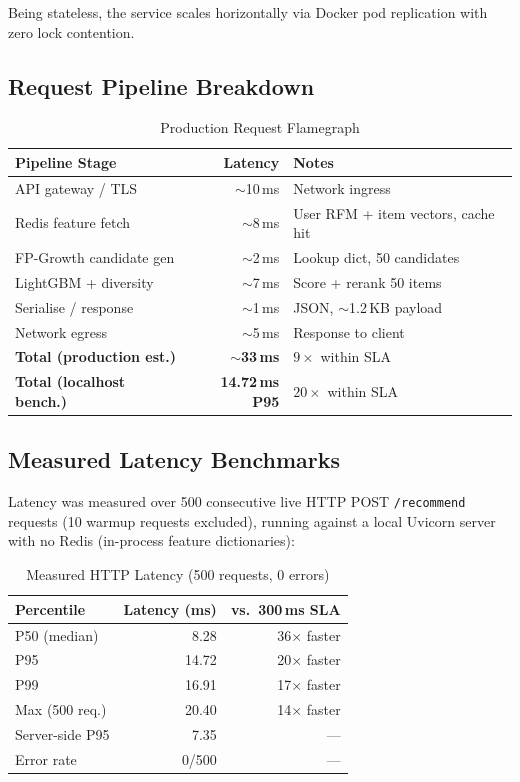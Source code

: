\documentclass[conference]{IEEEtran}
\begin{document}
Being stateless, the service scales horizontally via Docker pod replication
with zero lock contention.

\subsection{Request Pipeline Breakdown}

\begin{table}[h]
\caption{Production Request Flamegraph}
\centering
\begin{tabular}{lrl}
\toprule
Pipeline Stage & Latency & Notes \\
\midrule
API gateway / TLS     & $\sim$10\,ms & Network ingress \\
Redis feature fetch   & $\sim$8\,ms  & User RFM + item vectors, cache hit \\
FP-Growth candidate gen & $\sim$2\,ms & Lookup dict, 50 candidates \\
LightGBM + diversity  & $\sim$7\,ms  & Score + rerank 50 items \\
Serialise / response  & $\sim$1\,ms  & JSON, $\sim$1.2\,KB payload \\
Network egress        & $\sim$5\,ms  & Response to client \\
\midrule
\textbf{Total (production est.)} & $\sim$\textbf{33\,ms} & $9\times$ within SLA \\
\textbf{Total (localhost bench.)} & \textbf{14.72\,ms P95} & $20\times$ within SLA \\
\bottomrule
\end{tabular}
\end{table}

\subsection{Measured Latency Benchmarks}

Latency was measured over 500 consecutive live HTTP POST \texttt{/recommend}
requests (10 warmup requests excluded), running against a local Uvicorn server
with no Redis (in-process feature dictionaries):

\begin{table}[h]
\caption{Measured HTTP Latency (500 requests, 0 errors)}
\centering
\begin{tabular}{lrr}
\toprule
Percentile & Latency (ms) & vs.\ 300\,ms SLA \\
\midrule
P50 (median)   & 8.28   & 36$\times$ faster \\
P95            & 14.72  & 20$\times$ faster \\
P99            & 16.91  & 17$\times$ faster \\
Max (500 req.) & 20.40  & 14$\times$ faster \\
\midrule
Server-side P95 & 7.35  & --- \\
Error rate      & 0/500 & --- \\
\bottomrule
\end{tabular}
\end{table}
\end{document}
